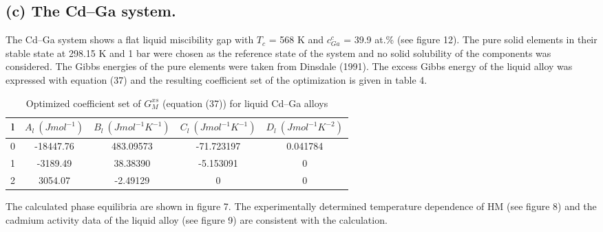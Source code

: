 \documentclass[12pt]{article}
\newcommand*{\1}{\hspace{1pt}}
\begin{document}
\subsection*{(c) The Cd–Ga system.}

The Cd–Ga system shows a flat liquid miscibility gap with $T _c$ = 568 K and $c^{c}_{Ga}$ = 39.9 at.\% (see figure 12). 
The pure solid elements in their stable state at 298.15 K and 1 bar were chosen as
the reference state of the system and no solid solubility of the components was considered. The
Gibbs energies of the pure elements were taken from Dinsdale (1991). The excess Gibbs
energy of the liquid alloy was expressed with equation (37) and the resulting coefficient
set of the optimization is given in table 4. 
\begin{table}[t!]
    \centering
    \caption{Optimized coefficient set of $G ^ {xs} _ {M}$ 
    (equation (37)) for liquid Cd–Ga alloys}
     \begin{tabular}{|c | c | c | c | c |} 
     \hline
     l & $A_l \ (J mol^{-1})$ & $B_l \ (J mol^{-1}K^{-1})$ & $C_l \ (J mol^{-1}K^{-1})$ & $D_l \ (J mol^{-1}K^{-2})$\\ [0.5ex] 
     \hline\hline
     0 & -18447.76 & 483.09573 & -71.723197 & 0.041784  \\ 
     1 & -3189.49 & 38.38390 & -5.153091 & 0 \\
     2 & 3054.07 & -2.49129 & 0 & 0  \\ [1ex] 
     \hline
     \end{tabular}
    \end{table}

The calculated phase equilibria are shown in
figure 7. The experimentally determined temperature dependence of HM (see figure 8)
and the cadmium activity data of the liquid alloy (see figure 9) are consistent with the calculation.

\begin{adjustbox}{center,caption={Calculated phase diagram (continuous curve) using the coefficient set given in
    table 4.},label={somelabel},nofloat=figure,vspace=\bigskipamount}
\end{adjustbox}
\begin{adjustbox}{center,caption={Calculated (continuous curve) enthalpy of mixing at different temperatures (1, 609 K;
    2, 656 K; 3,695 K) using the coefficient set given in table 4.},label={somelabel},nofloat=figure,vspace=\bigskipamount}
\end{adjustbox}
\begin{adjustbox}{center,caption={Calculated (continuous curve) activities at 742 K using the coefficient set given in
    table 4.},label={somelabel},nofloat=figure,vspace=\bigskipamount}
\end{adjustbox}
\end{document}
